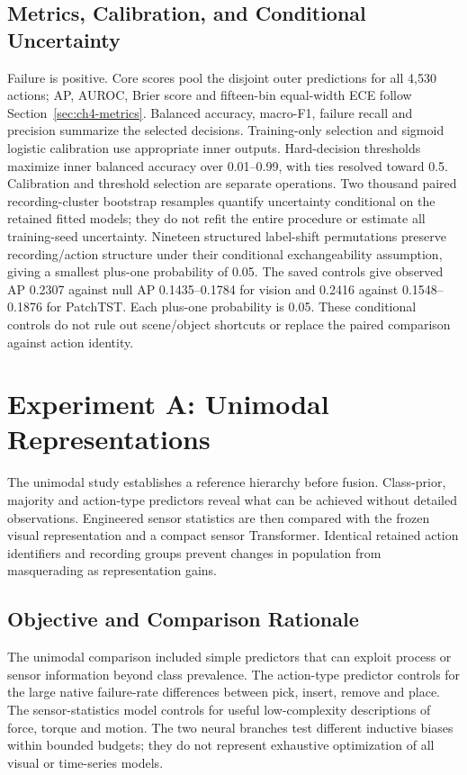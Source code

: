 \subsection{Metrics, Calibration, and Conditional Uncertainty}
Failure is positive. Core scores pool the disjoint outer predictions for all 4,530
actions; AP, AUROC, Brier score and fifteen-bin equal-width ECE follow
Section~\ref{sec:ch4-metrics}. Balanced accuracy, macro-F1, failure recall and precision
summarize the selected decisions. Training-only selection and sigmoid logistic calibration use
appropriate inner outputs. Hard-decision thresholds maximize inner balanced accuracy
over 0.01--0.99, with ties resolved toward 0.5. Calibration and threshold selection are
separate operations. Two thousand paired recording-cluster bootstrap resamples quantify
uncertainty conditional on the retained fitted models; they do not refit the entire
procedure or estimate all training-seed uncertainty. Nineteen structured label-shift
permutations preserve recording/action structure under their conditional exchangeability
assumption, giving a smallest plus-one probability of 0.05. The saved controls give observed AP
0.2307 against null AP 0.1435--0.1784 for vision and 0.2416 against 0.1548--0.1876
for PatchTST. Each plus-one probability is 0.05. These conditional controls do not rule
out scene/object shortcuts or replace the paired comparison against action identity.

\section{Experiment A: Unimodal Representations}
The unimodal study establishes a reference hierarchy before fusion. Class-prior,
majority and action-type predictors reveal what can be achieved without detailed
observations. Engineered sensor statistics are then compared with the frozen visual
representation and a compact sensor Transformer. Identical retained action identifiers
and recording groups prevent changes in population from masquerading as representation
gains.

\subsection{Objective and Comparison Rationale}
The unimodal comparison included simple predictors that can exploit process or sensor
information beyond class prevalence. The action-type predictor controls for the large
native failure-rate differences between pick, insert, remove and place. The
sensor-statistics model controls for useful low-complexity descriptions of force, torque
and motion. The two neural branches test different inductive biases within bounded
budgets; they do not represent exhaustive optimization of all visual or time-series
models.

